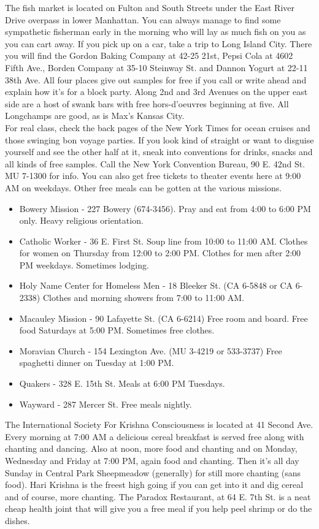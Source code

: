 \documentclass[11pt,twoside,a4paper]{book}
\begin{document}
The fish market is located on Fulton and South Streets under the East River Drive overpass in lower Manhattan. You can always manage to find some sympathetic fisherman early in the morning who will lay as much fish on you as you can cart away. If you pick up on a car, take a trip to Long Island City. There you will find the Gordon Baking Company at 42-25 21st, Pepsi Cola at 4602 Fifth Ave., Borden Company at 35-10 Steinway St. and Dannon Yogurt at 22-11 38th Ave. All four places give out samples for free if you call or write ahead and explain how it's for a block party. Along 2nd and 3rd Avenues on the upper east side are a host of swank bars with free hors-d'oeuvres beginning at five. All Longchamps are good, as is Max's Kansas City.~\\

For real class, check the back pages of the New York Times for ocean cruises and those swinging bon voyage parties. If you look kind of straight or want to disguise yourself and see the other half at it, sneak into conventions for drinks, snacks and all kinds of free samples. Call the New York Convention Bureau, 90 E. 42nd St. MU 7-1300 for info. You can also get free tickets to theater events here at 9:00 AM on weekdays. Other free meals can be gotten at the various missions.
\begin{itemize}
\item Bowery Mission - 227 Bowery (674-3456). Pray and eat from 4:00 to 6:00 PM only. Heavy religious orientation.
\item Catholic Worker - 36 E. First St. Soup line from 10:00 to 11:00 AM. Clothes for women on Thursday from 12:00 to 2:00 PM. Clothes for men after 2:00 PM weekdays. Sometimes lodging. 
\item Holy Name Center for Homeless Men - 18 Bleeker St. (CA 6-5848 or CA 6-2338) Clothes and morning showers from 7:00 to 11:00 AM. 
\item Macauley Mission - 90 Lafayette St. (CA 6-6214) Free room and board. Free food Saturdays at 5:00 PM. Sometimes free clothes. 
\item Moravian Church - 154 Lexington Ave. (MU 3-4219 or 533-3737) Free spaghetti dinner on Tuesday at 1:00 PM. 
\item Quakers - 328 E. 15th St. Meals at 6:00 PM Tuesdays. 
\item Wayward - 287 Mercer St. Free meals nightly.
\end{itemize}
The International Society For Krishna Consciousness is located at 41 Second Ave. Every morning at 7:00 AM a delicious cereal breakfast is served free along with chanting and dancing. Also at noon, more food and chanting and on Monday, Wednesday and Friday at 7:00 PM, again food and chanting. Then it's all day Sunday in Central Park Sheepmeadow (generally) for still more chanting (sans food). Hari Krishna is the freest high going if you can get into it and dig cereal and of course, more chanting. The Paradox Restaurant, at 64 E. 7th St. is a neat cheap health joint that will give you a free meal if you help peel shrimp or do the dishes.~\\
\end{document}
